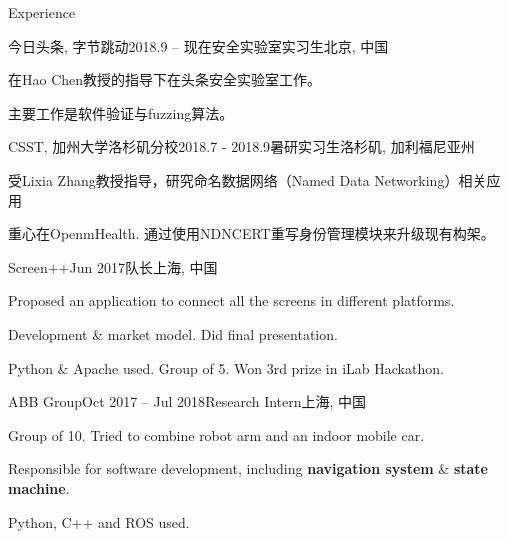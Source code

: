 \documentclass{resume} %
\begin{document}
\begin{rSection}{Experience}

\begin{rSubsection}
  {今日头条, 字节跳动}{2018.9 – 现在}{安全实验室实习生}{北京, 中国}
    \item 在Hao Chen教授的指导下在头条安全实验室工作。
    \item 主要工作是软件验证与fuzzing算法。
\end{rSubsection}


\begin{rSubsection}
  {CSST, 加州大学洛杉矶分校}{2018.7 - 2018.9}{暑研实习生}{洛杉矶, 加利福尼亚州}
    \item 受Lixia Zhang教授指导，研究命名数据网络（Named Data Networking）相关应用
    \item 重心在OpenmHealth. 通过使用NDNCERT重写身份管理模块来升级现有构架。
\end{rSubsection}


\begin{rSubsection}
  {Screen++}{Jun 2017}{队长}{上海, 中国}
    \item Proposed an application to connect all the screens in different platforms.
    \item Development \& market model. Did final presentation.
    \item Python \& Apache used. Group of 5. Won 3rd prize in iLab Hackathon.
\end{rSubsection}


\begin{rSubsection}
  {ABB Group}{Oct 2017 – Jul 2018}{Research Intern}{上海, 中国}
    \item Group of 10. Tried to combine robot arm and an indoor mobile car.
    \item Responsible for software development, including \textbf{navigation system} \& \textbf{state machine}.
    \item Python, C++ and ROS used.
\end{rSubsection}

\end{rSection}
\end{document}
